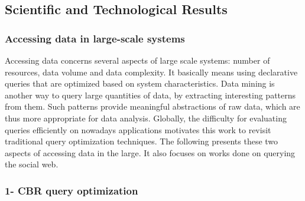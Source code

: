 \subsection{Scientific and Technological Results} %
\label{sub:hadas_scientific_and_technological_results}

\subsubsection{Accessing data in large-scale systems}
\label{optimisation}

Accessing data concerns several aspects of large scale systems: number of resources, data volume and data complexity. It basically means using declarative queries that are optimized based on system characteristics.
Data mining is another way to query large quantities of data, by extracting interesting patterns from them. Such patterns provide meaningful abstractions of raw data, which are thus more appropriate for data analysis. 
Globally, the difficulty for evaluating queries efficiently on nowadays applications motivates this work to revisit traditional query optimization techniques. The following presents these two aspects of accessing data in the large. It also focuses on works done on querying the social web. 

\subsubsection*{1- CBR query optimization}

